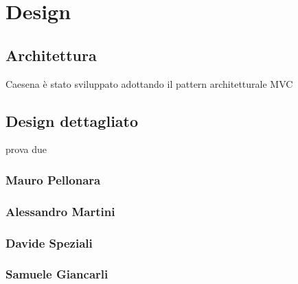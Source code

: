 \section{Design}
\subsection{Architettura}
Caesena è stato sviluppato adottando il pattern architetturale MVC 
\subsection{Design dettagliato}
prova due
\subsubsection*{Mauro Pellonara} 

\subsubsection*{Alessandro Martini}

\subsubsection*{Davide Speziali}

\subsubsection*{Samuele Giancarli}
